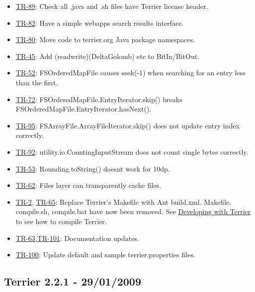 \begin{itemize}
\tightlist
\item
  \href{http://terrier.org/issues/browse/TR-89}{TR-89}: Check all .java
  and .sh files have Terrier license header.
\item
  \href{http://terrier.org/issues/browse/TR-82}{TR-82}: Have a simple
  webapps search results interface.
\item
  \href{http://terrier.org/issues/browse/TR-80}{TR-80}: Move code to
  terrier.org Java package namespaces.
\item
  \href{http://terrier.org/issues/browse/TR-45}{TR-45}: Add
  (read\textbar{}write)(Delta\textbar{}Golomb) etc to BitIn/BitOut.
\item
  \href{http://terrier.org/issues/browse/TR-52}{TR-52}: FSOrderedMapFile
  causes seek(-1) when searching for an entry less than the first.
\item
  \href{http://terrier.org/issues/browse/TR-}{TR-72}:
  FSOrderedMapFile.EntryIterator.skip() breaks
  FSOrderedMapFile.EntryIterator.hasNext().
\item
  \href{http://terrier.org/issues/browse/TR-95}{TR-95}:
  FSArrayFile.ArrayFileIterator.skip() does not update entry index
  correctly.
\item
  \href{http://terrier.org/issues/browse/TR-92}{TR-92}:
  utility.io.CountingInputStream does not count single bytes correctly.
\item
  \href{http://terrier.org/issues/browse/TR-53}{TR-53}:
  Rounding.toString() doesnt work for 10dp.
\item
  \href{http://terrier.org/issues/browse/TR-62}{TR-62}: Files layer can
  transparently cache files.
\item
  \href{http://terrier.org/issues/browse/TR-2}{TR-2},
  \href{http://terrier.org/issues/browse/TR-}{TR-65}: Replace Terrier's
  Makefile with Ant build.xml. Makefile, compile.sh, compile.bat have
  now been removed. See \href{terrier_develop.html}{Developing with
  Terrier} to see how to compile Terrier.
\item
  \href{http://terrier.org/issues/browse/TR-63}{TR-63},\href{http://terrier.org/issues/browse/TR-101}{TR-101}:
  Documentation updates.
\item
  \href{http://terrier.org/issues/browse/TR-100}{TR-100}: Update default
  and sample terrier.properties files.
\end{itemize}

\subsection{Terrier 2.2.1 - 29/01/2009}\label{terrier-2.2.1---29012009}

